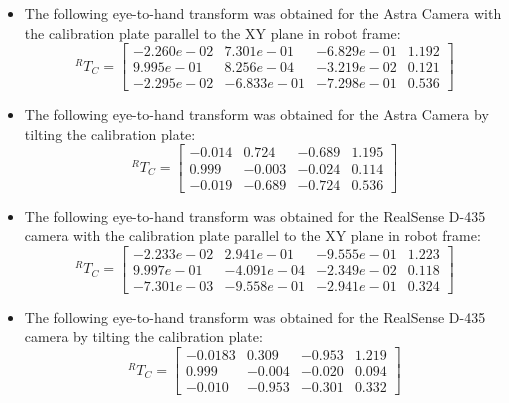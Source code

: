 \begin{itemize}
\item The following eye-to-hand transform was obtained for the Astra Camera with the calibration plate parallel to the XY plane in robot frame:
\begin{equation}
^{R}T_{C}=\begin{bmatrix} -2.260e-02 & 7.301e-01 & -6.829e-01 & 1.192\\9.995e-01 & 8.256e-04 & -3.219e-02 & 0.121\\ -2.295e-02 & -6.833e-01 & -7.298e-01 & 0.536 \end{bmatrix}
\end{equation}

\item The following eye-to-hand transform was obtained for the Astra Camera by tilting the calibration plate:
\begin{equation}
^{R}T_{C}=\begin{bmatrix} -0.014 & 0.724 & -0.689 & 1.195\\0.999 & -0.003 & -0.024 & 0.114\\ -0.019 & -0.689 & -0.724 & 0.536 \end{bmatrix}
\end{equation}


\item The following eye-to-hand transform was obtained for the RealSense D-435 camera with the calibration plate parallel to the XY plane in robot frame:
\begin{equation}
^{R}T_{C}=\begin{bmatrix} -2.233e-02 & 2.941e-01 & -9.555e-01 &1.223\\9.997e-01 & -4.091e-04 & -2.349e-02 & 0.118 \\ -7.301e-03 & -9.558e-01 & -2.941e-01 & 0.324  \end{bmatrix}
\end{equation}

\item The following eye-to-hand transform was obtained for the RealSense D-435 camera by tilting the calibration plate:
\begin{equation}
^{R}T_{C}=\begin{bmatrix} -0.0183 & 0.309 &-0.953 & 1.219\\0.999& -0.004& -0.020& 0.094\\ -0.010& -0.953& -0.301& 0.332\end{bmatrix}
\end{equation}
\end{itemize}

